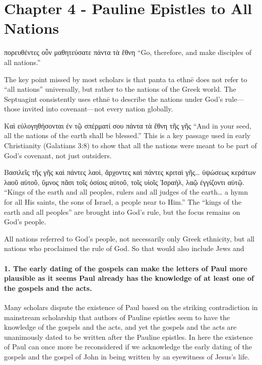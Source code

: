 \hfuzz=5pt %

\section{Chapter 4 - Pauline Epistles to All Nations}\label{sec:chapter-4---pauline-epistles-to-all-nations}

πορευθέντες οὖν μαθητεύσατε πάντα τὰ ἔθνη ``Go, therefore, and make disciples of all nations.''

The key point missed by most scholars is that panta ta ethnē does not refer to ``all nations'' universally, but rather to the nations of the Greek world.
The Septuagint consistently uses ethnē to describe the nations under God's rule---those invited into covenant---not every nation globally.

Καὶ εὐλογηθήσονται ἐν τῷ σπέρματί σου πάντα τὰ ἔθνη τῆς γῆς ``And in your seed, all the nations of the earth shall be blessed.'' This is a key passage used in early Christianity (Galatians 3:8) to show that all the nations were meant to be part of God's covenant, not just outsiders.

Βασιλεῖς τῆς γῆς καὶ πάντες λαοὶ, ἄρχοντες καὶ πάντες κριταὶ γῆς\ldots{} ὑψώσεως κεράτων λαοῦ αὐτοῦ, ὕμνος πᾶσι τοῖς ὁσίοις αὐτοῦ, τοῖς υἱοῖς Ἰσραὴλ, λαῷ ἐγγίζοντι αὐτῷ.
``Kings of the earth and all peoples, rulers and all judges of the earth\ldots{} a hymn for all His saints, the sons of Israel, a people near to Him.'' The ``kings of the earth and all peoples'' are brought into God's rule, but the focus remains on God's people.

All nations referred to God's people, not necessarily only Greek ethnicity, but all nations who proclaimed the rule of God.
So that would also include Jews and

\paragraph{1.
The early dating of the gospels can make the letters of Paul more plausible as it seems Paul already has the knowledge of at least one of the gospels and the acts.}\label{par:the-early-dating-of-the-gospels-can-make-the-letters-of-paul-more-plausible-as-it-seems-paul-already-has-the-knowledge-of-at-least-one-of-the-gospels-and-the-acts.}

Many scholars dispute the existence of Paul based on the striking contradiction in mainstream scholarship that authors of Pauline epistles seem to have the knowledge of the gospels and the acts, and yet the gospels and the acts are unanimously dated to be written after the Pauline epistles.
In here the existence of Paul can once more be reconsidered if we acknowledge the early dating of the gospels and the gospel of John in being written by an eyewitness of Jesus's life.

